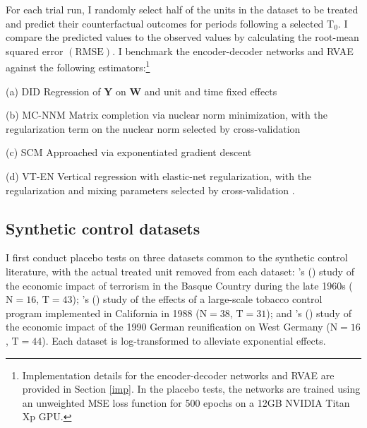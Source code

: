 \documentclass[hidelinks,12pt]{article}
\newcommand{\possessivecite}[1]{\citeauthor{#1}'s (\citeyear{#1})}
\begin{document}
For each trial run, I randomly select half of the units in the dataset to be treated and predict their counterfactual outcomes for periods following a selected $\text{T}_0$. I compare the predicted values to the observed values by calculating the root-mean squared error $(\text{RMSE})$. I benchmark the encoder-decoder networks and RVAE against the following estimators:\footnote{Implementation details for the encoder-decoder networks and RVAE are provided in Section \ref{imp}. In the placebo tests, the networks are trained using an unweighted MSE loss function for 500 epochs on a 12GB NVIDIA Titan Xp GPU.}
%
\begin{description}
	\begin{singlespace}
		{\setlength\itemindent{1mm}
			\item[(a) DID] Regression of $\textbf{Y}$ on $\textbf{W}$ and unit and time fixed effects
			\item[(b) MC-NNM] Matrix completion via nuclear norm minimization, with the regularization term on the nuclear norm selected by cross-validation \citep{athey2017matrix}
			\item[(c) SCM] Approached via exponentiated gradient descent \citep{abadie2010synthetic}
			\item[(d) VT-EN] Vertical regression with elastic-net regularization, with the regularization and mixing parameters selected by cross-validation \citep{zou2005regularization,athey2017matrix}.
		}
	\end{singlespace}
\end{description}

\subsection{Synthetic control datasets} \label{synth-placebo}

I first conduct placebo tests on three datasets common to the synthetic control literature, with the actual treated unit removed from each dataset: \possessivecite{abadie2003economic} study of the economic impact of terrorism in the Basque Country during the late 1960s ($\text{N}=16$, $\text{T}=43$); \possessivecite{abadie2010synthetic} study of the effects of a large-scale tobacco control program implemented in California in 1988 ($\text{N}=38$, $\text{T}=31$); and \possessivecite{abadie2015comparative} study of the economic impact of the 1990 German reunification on West Germany ($\text{N}=16$, $\text{T}=44$). Each dataset is log-transformed to alleviate exponential effects.
\end{document}
